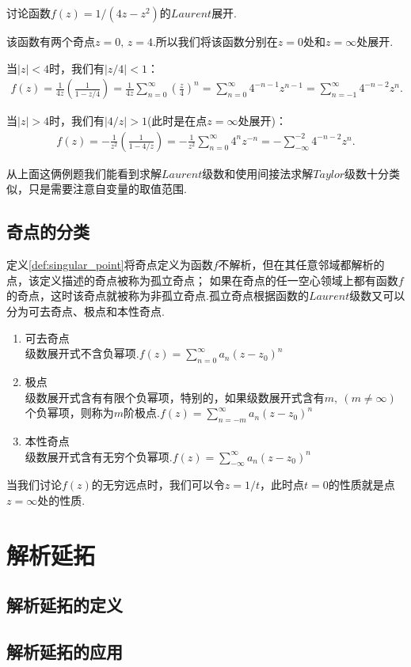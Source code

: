         \begin{example}
            讨论函数$f(z)=1/(4z-z^2)$的$Laurent$展开.
        \end{example}
        \begin{solution}
            该函数有两个奇点$z=0,\,z=4$.所以我们将该函数分别在$z=0$处和$z=\infty$处展开.

            当$|z|<4$时，我们有$|z/4|<1$：
            \begin{align*}
                f(z)=\frac{1}{4z}\left(\frac{1}{1-z/4}\right)=\frac{1}{4z}\sum_{n=0}^{\infty}\left(\frac{z}{4}\right)^n=\sum_{n=0}^{\infty}4^{-n-1}z^{n-1}=\sum_{n=-1}^{\infty}4^{-n-2}z^n.
            \end{align*}

            当$|z|>4$时，我们有$|4/z|>1$(此时是在点$z=\infty$处展开)：
            \begin{align*}
                f(z)=-\frac{1}{z^2}\left(\frac{1}{1-4/z}\right)=-\frac{1}{z^2}\sum_{n=0}^{\infty}4^nz^{-n}=-\sum_{-\infty}^{-2}4^{-n-2}z^{n}.
            \end{align*}
        \end{solution}

        从上面这俩例题我们能看到求解$Laurent$级数和使用间接法求解$Taylor$级数十分类似，只是需要注意自变量的取值范围.

    \subsection{奇点的分类}
        定义\ref{def:singular_point}将奇点定义为函数$f$不解析，但在其任意邻域都解析的点，该定义描述的奇点被称为孤立奇点；
        如果在奇点的任一空心领域上都有函数$f$的奇点，这时该奇点就被称为非孤立奇点.孤立奇点根据函数的$Laurent$级数又可以分为可去奇点、极点和本性奇点.
        \begin{enumerate}
            \item 可去奇点\\
                级数展开式不含负幂项.$f(z)=\sum_{n=0}^{\infty}a_n(z-z_0)^n$
            \item 极点\\
                级数展开式含有有限个负幂项，特别的，如果级数展开式含有$m,\ (m\neq \infty)$个负幂项，则称为$m$阶极点.$f(z)=\sum_{n=-m}^{\infty}a_n(z-z_0)^n$
            \item 本性奇点\\
                级数展开式含有无穷个负幂项.$f(z)=\sum_{-\infty}^{\infty}a_n(z-z_0)^n$
        \end{enumerate}

        \begin{note}
            当我们讨论$f(z)$的无穷远点时，我们可以令$z=1/t$，此时点$t=0$的性质就是点$z=\infty$处的性质.
        \end{note}


\section{解析延拓}

    \subsection{解析延拓的定义}

    \subsection{解析延拓的应用}